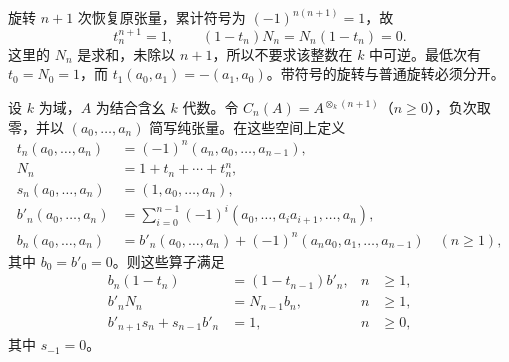 旋转 \(n+1\) 次恢复原张量，累计符号为 \((-1)^{n(n+1)}=1\)，故
\[
	t_n^{n+1}=1,\qquad (1-t_n)N_n=N_n(1-t_n)=0.
\]
这里的 \(N_n\) 是求和，未除以 \(n+1\)，所以不要求该整数在 \(k\) 中可逆。最低次有 \(t_0=N_0=1\)，而 \(t_1(a_0,a_1)=-(a_1,a_0)\)。带符号的旋转与普通旋转必须分开。

\begin{lemma}\label{b4:lem:cyclic-boundary-identities}
	设 \(k\) 为域，\(A\) 为结合含幺 \(k\) 代数。令 \(C_n(A)=A^{\otimes_k(n+1)}\)（\(n\ge0\)），负次取零，并以 \((a_0,\ldots,a_n)\) 简写纯张量。在这些空间上定义
	\[
		\begin{aligned}
			t_n(a_0,\ldots,a_n)&=(-1)^n(a_n,a_0,\ldots,a_{n-1}),\\
			N_n&=1+t_n+\cdots+t_n^n,\\
			s_n(a_0,\ldots,a_n)&=(1,a_0,\ldots,a_n),\\
			b'_n(a_0,\ldots,a_n)&=\sum_{i=0}^{n-1}(-1)^i(a_0,\ldots,a_ia_{i+1},\ldots,a_n),\\
			b_n(a_0,\ldots,a_n)&=b'_n(a_0,\ldots,a_n)+(-1)^n(a_na_0,a_1,\ldots,a_{n-1})\quad(n\ge1),
		\end{aligned}
	\]
	其中 \(b_0=b'_0=0\)。则这些算子满足
	\begin{equation}\label{b4:eq:cyclic-boundary-identities}
		\begin{aligned}
			b_n(1-t_n)&=(1-t_{n-1})b'_n, & n&\ge1,\\
			b'_nN_n&=N_{n-1}b_n, & n&\ge1,\\
			b'_{n+1}s_n+s_{n-1}b'_n&=1, & n&\ge0,
		\end{aligned}
	\end{equation}
	其中 \(s_{-1}=0\)。
\end{lemma}
